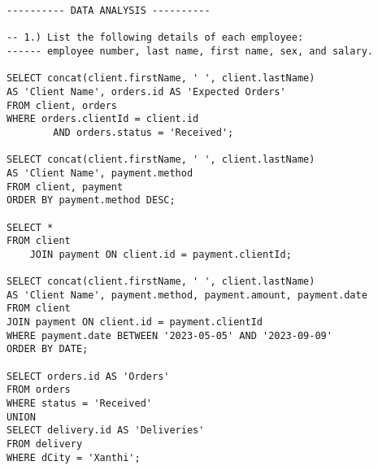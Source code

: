 \begin{lstlisting}
---------- DATA ANALYSIS ----------

-- 1.) List the following details of each employee: 
------ employee number, last name, first name, sex, and salary.

SELECT concat(client.firstName, ' ', client.lastName) 
AS 'Client Name', orders.id AS 'Expected Orders'
FROM client, orders
WHERE orders.clientId = client.id 
		AND orders.status = 'Received';

SELECT concat(client.firstName, ' ', client.lastName) 
AS 'Client Name', payment.method
FROM client, payment
ORDER BY payment.method DESC;

SELECT * 
FROM client 
	JOIN payment ON client.id = payment.clientId;
    
SELECT concat(client.firstName, ' ', client.lastName) 
AS 'Client Name', payment.method, payment.amount, payment.date
FROM client
JOIN payment ON client.id = payment.clientId
WHERE payment.date BETWEEN '2023-05-05' AND '2023-09-09' 
ORDER BY DATE;

SELECT orders.id AS 'Orders'
FROM orders
WHERE status = 'Received'
UNION
SELECT delivery.id AS 'Deliveries'
FROM delivery
WHERE dCity = 'Xanthi';
\end{lstlisting}